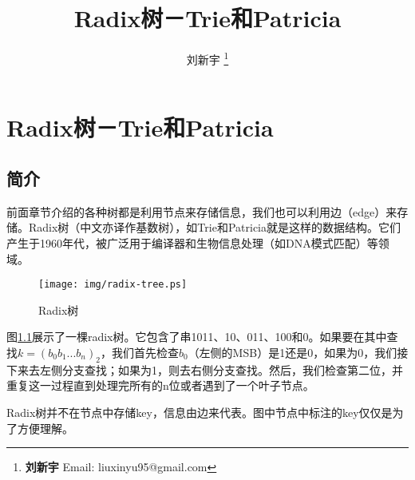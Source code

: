 \documentclass[UTF8]{article}
\begin{document}


\title{Radix树－Trie和Patricia}

\author{刘新宇
\thanks{{\bfseries 刘新宇 } \newline
  Email: liuxinyu95@gmail.com \newline}
  }

\maketitle
\fi


\ifx\wholebook\relax
\chapter{Radix树－Trie和Patricia}
\fi



\section{简介}
\label{introduction}

前面章节介绍的各种树都是利用节点来存储信息，我们也可以利用边（edge）来存储。Radix树（中文亦译作基数树），如Trie和Patricia就是这样的数据结构。它们产生于1960年代，被广泛用于编译器\cite{okasaki-int-map}和生物信息处理（如DNA模式匹配）\cite{wiki-suffix-tree}等领域。

\begin{figure}[htbp]
  \centering
  \texttt{[image: img/radix-tree.ps]}
  \caption{Radix树} \label{fig:radix-tree}
\end{figure}

图\ref{fig:radix-tree}展示了一棵radix树\cite{CLRS}。它包含了串1011、10、011、100和0。如果要在其中查找$k=(b_0b_1...b_n)_2$，我们首先检查$b_0$（左侧的MSB）是1还是0，如果为0，我们接下来去左侧分支查找；如果为1，则去右侧分支查找。然后，我们检查第二位，并重复这一过程直到处理完所有的n位或者遇到了一个叶子节点。

Radix树并不在节点中存储key，信息由边来代表。图中节点中标注的key仅仅是为了方便理解。
\end{document}
